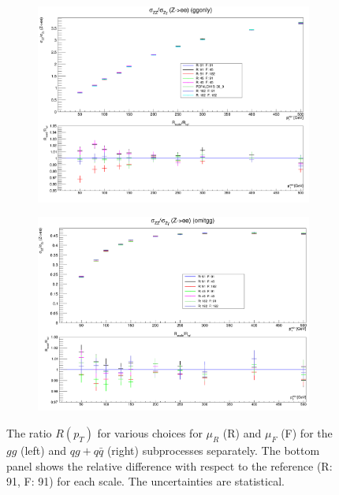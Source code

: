 \documentclass[11pt,a4paper]{report}
\begin{document}
\begin{figure}[H]
\centering
	\begin{subfigure}{0.49\textwidth}
		\includegraphics[width=\linewidth]{scale/ggonly_nlo_scale_overlay.png}
		\caption{}
	\end{subfigure}
	\begin{subfigure}{0.49\textwidth}
		\includegraphics[width=\linewidth]{scale/omitgg_nlo_scale_overlay.png}
		\caption{}
	\end{subfigure}	
\caption{The ratio $R(p_T)$ for various choices for $\mu_R$ (R) and $\mu_F$ (F) for the $gg$ (left) and $qg+q\bar{q}$ (right) subprocesses separately. The bottom panel shows the relative difference with respect to the reference (R: 91, F: 91) for each scale. The uncertainties are statistical.}
\label{fig:gg_scale}
\end{figure}
\end{document}
